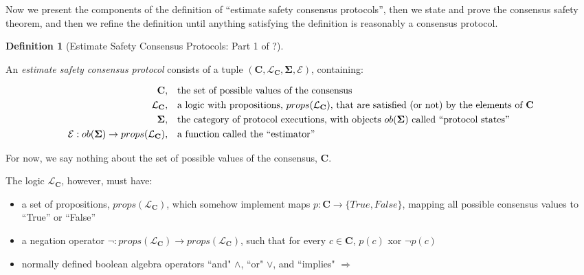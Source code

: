 \documentclass{article}
\theoremstyle{definition}
\newtheorem{defn}{Definition}[section]
\newcommand{\cat}{
	\mathbf
}
\begin{document}
Now we present the components of the definition of ``estimate safety consensus protocols'', then we state and prove the consensus safety theorem, and then we refine the definition until anything satisfying the definition is reasonably a consensus protocol.

\vspace{5mm}

\begin{defn}[Estimate Safety Consensus Protocols: Part 1 of ?]

\begin{description}An \emph{estimate safety consensus protocol} consists of a tuple $(\cat{C}, \mathcal{L}_\cat{C}, \cat{\Sigma}, \mathcal{E})$, containing:

\begin{align*}
\cat{C}, & &&\text{the set of possible values of the consensus}\\
\mathcal{L}_\cat{C}, & &&\text{a logic with propositions, $props(\mathcal{L}_\cat{C})$, that are satisfied (or not) by the elements of $\cat{C}$}\\
\cat{\Sigma}, & &&\text{the category of protocol executions, with objects $ob(\cat{\Sigma})$ called ``protocol states''}\\
\mathcal{E} : ob(\cat{\Sigma}) \to props(\mathcal{L}_\cat{C}), & &&\text{a function called the ``estimator''}
\end{align*}

For now, we say nothing about the set of possible values of the consensus, $\cat{C}$.

The logic $\mathcal{L}_\cat{C}$, however, must have:

   

\begin{itemize}
\item a set of propositions, $props(\mathcal{L}_\cat{C})$, which somehow implement maps $p:\cat{C} \to \{True, False\}$, mapping all possible consensus values to ``True'' or ``False''
\item a negation operator $\neg: props(\mathcal{L}_\cat{C}) \to props(\mathcal{L}_\cat{C})$, such that for every $c \in \cat{C}$, $p(c)$ xor $\neg{p}(c)$
\item normally defined boolean algebra operators ``and" $\land$, ``or" $\lor$, and ``implies" $\Rightarrow$
\end{itemize}


\end{description}
\end{defn}
\end{document}
